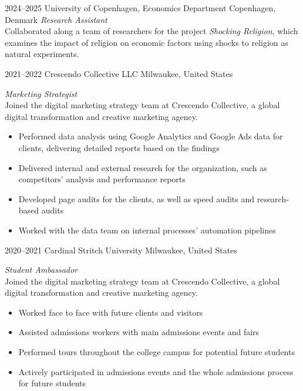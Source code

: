 \documentclass[]{friggeri-cv-a4}
\begin{document}
\begin{entrylist}

\entry
{2024--2025}
{University of Copenhagen, Economics Department}
{Copenhagen, Denmark}
{\emph{Research Assistant} \\
Collaborated along a team of researchers for the project \emph{Shocking Religion}, which examines the impact of religion on economic factors using shocks to religion as natural experiments. \\}


\entry
{2021--2022}
{Crescendo Collective LLC}
{Milwaukee, United States}
{\emph{Marketing Strategist} \\
Joined the digital marketing strategy team at Crescendo Collective, a global digital transformation and creative marketing agency.\\
\begin{itemize}
\item Performed data analysis using Google Analytics and Google Ads data for clients, delivering detailed reports based on the findings
\item Delivered internal and external research for the organization, such as competitors’ analysis and performance reports
\item Developed page audits for the clients, as well as speed audits and research-based audits
\item Worked with the data team on internal processes' automation pipelines
\end{itemize}}


\entry
{2020--2021}
{Cardinal Stritch University}
{Milwaukee, United States}
{\emph{Student Ambassador} \\
Joined the digital marketing strategy team at Crescendo Collective, a global digital transformation and creative marketing agency.\\
\begin{itemize}
\item Worked face to face with future clients and visitors
\item Assisted admissions workers with main admissions events and fairs
\item Performed tours throughout the college campus for potential future students
\item Actively participated in admissions events and the whole admissions process for future students
\end{itemize}}


\end{entrylist}
\end{document}
